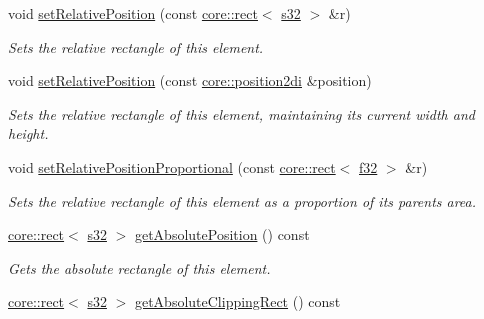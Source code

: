 \begin{DoxyCompactItemize}
void \hyperlink{classirr_1_1gui_1_1IGUIElement_a0e5bb2d0a2e88e30d3697652f8dd7034}{set\+Relative\+Position} (const \hyperlink{classirr_1_1core_1_1rect}{core\+::rect}$<$ \hyperlink{namespaceirr_ac66849b7a6ed16e30ebede579f9b47c6}{s32} $>$ \&r)
\begin{DoxyCompactList}\small\item\em Sets the relative rectangle of this element. \end{DoxyCompactList}\item 
void \hyperlink{classirr_1_1gui_1_1IGUIElement_aba1cfc75daa28e53a021faa2d954b79b}{set\+Relative\+Position} (const \hyperlink{namespaceirr_1_1core_ace0f1379db5f9f5660456ec57ab78202}{core\+::position2di} \&position)
\begin{DoxyCompactList}\small\item\em Sets the relative rectangle of this element, maintaining its current width and height. \end{DoxyCompactList}\item 
void \hyperlink{classirr_1_1gui_1_1IGUIElement_aa67e02ab54db1068e7c057721d2f24a5}{set\+Relative\+Position\+Proportional} (const \hyperlink{classirr_1_1core_1_1rect}{core\+::rect}$<$ \hyperlink{namespaceirr_a0277be98d67dc26ff93b1a6a1d086b07}{f32} $>$ \&r)
\begin{DoxyCompactList}\small\item\em Sets the relative rectangle of this element as a proportion of its parent\textquotesingle{}s area. \end{DoxyCompactList}\item 
\mbox{\label{classirr_1_1gui_1_1IGUIElement_a6c5b94dd889533a306a03e25d0998bdf}} 
\hyperlink{classirr_1_1core_1_1rect}{core\+::rect}$<$ \hyperlink{namespaceirr_ac66849b7a6ed16e30ebede579f9b47c6}{s32} $>$ \hyperlink{classirr_1_1gui_1_1IGUIElement_a6c5b94dd889533a306a03e25d0998bdf}{get\+Absolute\+Position} () const
\begin{DoxyCompactList}\small\item\em Gets the absolute rectangle of this element. \end{DoxyCompactList}\item 
\mbox{\label{classirr_1_1gui_1_1IGUIElement_ad06166ccb3e9c86f17bd2a6cfc627eba}} 
\hyperlink{classirr_1_1core_1_1rect}{core\+::rect}$<$ \hyperlink{namespaceirr_ac66849b7a6ed16e30ebede579f9b47c6}{s32} $>$ \hyperlink{classirr_1_1gui_1_1IGUIElement_ad06166ccb3e9c86f17bd2a6cfc627eba}{get\+Absolute\+Clipping\+Rect} () const

\end{DoxyCompactItemize}
